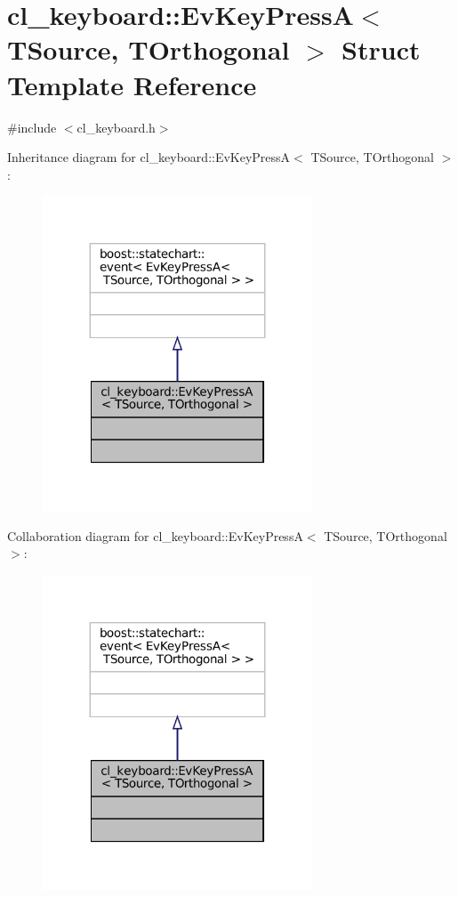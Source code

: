 \hypertarget{structcl__keyboard_1_1EvKeyPressA}{}\section{cl\+\_\+keyboard\+:\+:Ev\+Key\+PressA$<$ T\+Source, T\+Orthogonal $>$ Struct Template Reference}
\label{structcl__keyboard_1_1EvKeyPressA}


{\ttfamily \#include $<$cl\+\_\+keyboard.\+h$>$}



Inheritance diagram for cl\+\_\+keyboard\+:\+:Ev\+Key\+PressA$<$ T\+Source, T\+Orthogonal $>$\+:
\nopagebreak
\begin{figure}[H]
\begin{center}
\leavevmode
\includegraphics[width=227pt]{structcl__keyboard_1_1EvKeyPressA__inherit__graph}
\end{center}
\end{figure}


Collaboration diagram for cl\+\_\+keyboard\+:\+:Ev\+Key\+PressA$<$ T\+Source, T\+Orthogonal $>$\+:
\nopagebreak
\begin{figure}[H]
\begin{center}
\leavevmode
\includegraphics[width=227pt]{structcl__keyboard_1_1EvKeyPressA__coll__graph}
\end{center}
\end{figure}


